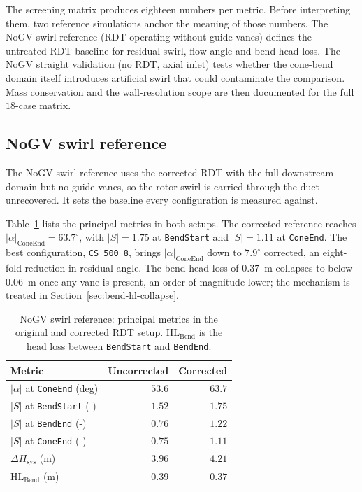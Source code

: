 The screening matrix produces eighteen numbers per metric. Before interpreting them, two reference simulations anchor the meaning of those numbers. The NoGV swirl reference (RDT operating without guide vanes) defines the untreated-RDT baseline for residual swirl, flow angle and bend head loss. The NoGV straight validation (no RDT, axial inlet) tests whether the cone-bend domain itself introduces artificial swirl that could contaminate the comparison. Mass conservation and the wall-resolution scope are then documented for the full \(18\)-case matrix.

\subsection{NoGV swirl reference}
\label{sec:nogv-swirl-reference}

The NoGV swirl reference uses the corrected RDT with the full downstream domain but no guide vanes, so the rotor swirl is carried through the duct unrecovered. It sets the baseline every configuration is measured against.

Table~\ref{tab:nogv-swirl-reference} lists the principal metrics in both setups. The corrected reference reaches \( |\alpha|_{\mathrm{ConeEnd}} = 63.7^\circ \), with \( |S|=1.75 \) at \texttt{BendStart} and \( |S|=1.11 \) at \texttt{ConeEnd}. The best configuration, \texttt{CS\_500\_8}, brings $|\alpha|_{\mathrm{ConeEnd}}$ down to $7.9^\circ$ corrected, an eight-fold reduction in residual angle. The bend head loss of $0.37$~m collapses to below $0.06$~m once any vane is present, an order of magnitude lower; the mechanism is treated in Section~\ref{sec:bend-hl-collapse}.

\begin{table}[H]
\centering
\small
\caption[NoGV swirl reference metrics]{NoGV swirl reference: principal metrics in the original and corrected RDT setup. $\mathrm{HL_{Bend}}$ is the head loss between \texttt{BendStart} and \texttt{BendEnd}.}
\label{tab:nogv-swirl-reference}
\begin{tabular}{l rr}
\hline
Metric & Uncorrected & Corrected \\ \hline
$|\alpha|$ at \texttt{ConeEnd} (deg) & $53.6$ & $63.7$ \\
$|S|$ at \texttt{BendStart} (-)      & $1.52$ & $1.75$ \\
$|S|$ at \texttt{BendEnd} (-)        & $0.76$ & $1.22$ \\
$|S|$ at \texttt{ConeEnd} (-)        & $0.75$ & $1.11$ \\
$\Delta H_{\mathrm{sys}}$ (m)        & $3.96$ & $4.21$ \\
$\mathrm{HL_{Bend}}$ (m)              & $0.39$ & $0.37$ \\
\hline
\end{tabular}
\end{table}

